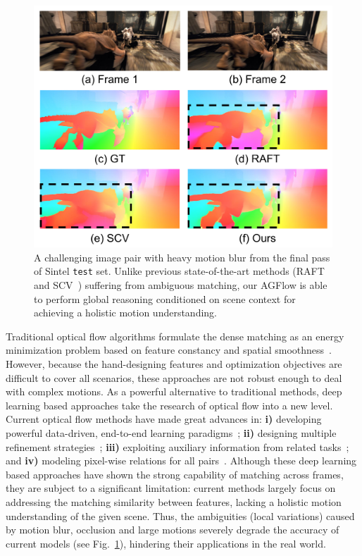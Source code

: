 \documentclass[letterpaper]{article} %
\begin{document}
\begin{figure}[t]
	\begin{center}
		\includegraphics[width=0.98\linewidth]{figs/fig1_crop}
	\end{center}
	\caption{A challenging image pair with heavy motion blur from the final pass of Sintel {\tt test} set. Unlike previous state-of-the-art methods (RAFT~\cite{Teed2020RAFTRA} and SCV~\cite{Jiang2021LearningOF}) suffering from ambiguous matching, our AGFlow is able to perform global reasoning conditioned on scene context for achieving a holistic motion understanding.}
	\label{fig:teaser}
\end{figure}

Traditional optical flow algorithms formulate the dense matching as an energy minimization problem based on feature constancy and spatial smoothness~\cite{Horn1981DeterminingOF, Brox2004HighAO, Bruhn2005LucasKanadeMH}. However, because the hand-designing features and optimization objectives are difficult to cover all scenarios, these approaches are not robust enough to deal with complex motions. As a powerful alternative to traditional methods, deep learning based approaches take the research of optical flow into a new level. Current optical flow methods have made great advances in: {\bfseries i)} developing powerful data-driven, end-to-end learning paradigms~\cite{Dosovitskiy2015FlowNetLO,Ilg2017FlowNet2E};  {\bfseries ii)} designing multiple refinement strategies~\cite{Sun2018PWCNetCF,Hur2019IterativeRR,Zhao2020MaskFlownetAF}; {\bfseries iii)} exploiting auxiliary information from related tasks~\cite{zhao2020msrn}; and {\bfseries iv)} modeling pixel-wise relations for all pairs~\cite{Teed2020RAFTRA, Jiang2021LearningOF}. Although these deep learning based approaches have shown the strong capability of matching across frames, they are subject to a significant limitation: current methods largely focus on addressing the matching similarity between features, lacking a holistic motion understanding of the given scene. Thus, the ambiguities (local variations) caused by motion blur, occlusion and large motions severely degrade the accuracy of current models (see Fig.~\ref{fig:teaser}), hindering their applications in the real world.
\end{document}
